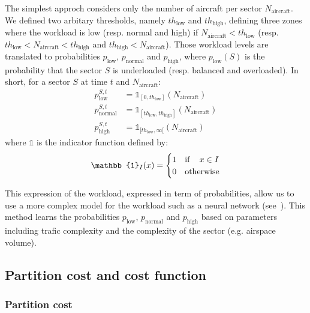 \documentclass[oneside,twocolumn]{article}
\begin{document}
The simplest approch considers only the number of aircraft per sector $N_\text{aircraft}$. We
defined two arbitary thresholds, namely $th_\text{low}$ and $th_\text{high}$, defining
three zones where the workload is low (resp. normal and high) if $N_\text{aircraft} < th_\text{low}$
(resp. $th_\text{low} < N_\text{aircraft} < th_\text{high}$ and $th_\text{high} < N_\text{aircraft}$).
Those workload levels are translated to probabilities $p_\text{low}$, $p_\text{normal}$ and
$p_\text{high}$, where $p_\text{low}(S)$ is the probability that the sector $S$ is underloaded
(resp. balanced and overloaded). In short, for a sector $S$ at time $t$ and $N_\text{aircraft}$:
\begin{equation}
  \begin{aligned}
    p_\text{low}^{S, t} &= \mathbb{1}_{[0, th_\text{low}]}(N_\text{aircraft}) \\
    p_\text{normal}^{S, t} &= \mathbb{1}_{[th_\text{low}, th_\text{high}]}(N_\text{aircraft})\\
    p_\text{high}^{S, t} &= \mathbb{1}_{[th_\text{low}, \infty[}(N_\text{aircraft})
  \end{aligned}
\end{equation}
where $\mathbb{1}$ is the indicator function defined by:
\begin{equation}
  \mathbb{1}_{I}(x) =
  \begin{cases}
    1 & \text{if\,} \quad x \in I\\
    0 & \text{otherwise}
  \end{cases}
\end{equation}

This expression of the workload, expressed in term of probabilities, allow us to
use a more complex model for the workload such as a neural network
(see~\cite{gianazza2010forecasting}). This method learns the probabilities $p_\text{low}$,
$p_\text{normal}$ and $p_\text{high}$ based on parameters including trafic complexity and
the complexity of the sector (e.g. airspace volume).

\subsection{Partition cost and cost function}

\subsubsection{Partition cost}
\end{document}
